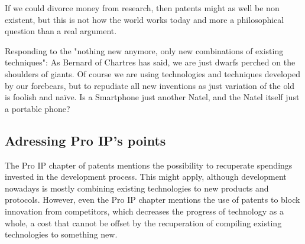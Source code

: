\documentclass[a4paper]{report}
\begin{document}
If we could divorce money from research, then patents might as well be non existent, but this is not how the world works today and more a philosophical question than a real argument.

Responding to the "nothing new anymore, only new combinations of existing techniques": As Bernard of Chartres has said, we are just dwarfs perched on the shoulders of giants. Of course we are using technologies and techniques developed by our forebears, but to repudiate all new inventions as just variation of the old is foolish and naïve. Is a Smartphone just another Natel, and the Natel itself just a portable phone?

\subsection{Adressing Pro IP's points}
The Pro IP chapter of patents mentions the possibility to recuperate spendings invested in the development process. This might apply, although development nowadays is mostly combining existing technologies to new products and protocols. However, even the Pro IP chapter mentions the use of patents to block innovation from competitors, which decreases the progress of technology as a whole, a cost that cannot be offset by the recuperation of compiling existing technologies to something new.
\end{document}
